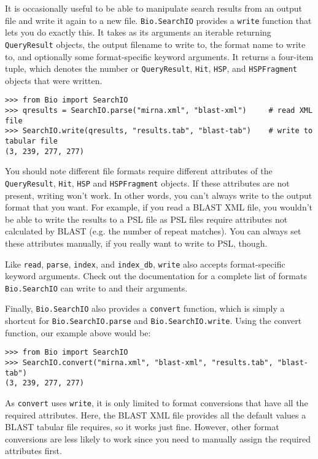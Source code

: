 It is occasionally useful to be able to manipulate search results from an output
file and write it again to a new file. \verb|Bio.SearchIO| provides a
\verb|write| function that lets you do exactly this. It takes as its arguments
an iterable returning \verb|QueryResult| objects, the output filename to write
to, the format name to write to, and optionally some format-specific keyword
arguments. It returns a four-item tuple, which denotes the number or
\verb|QueryResult|, \verb|Hit|, \verb|HSP|, and \verb|HSPFragment| objects that
were written.

\begin{verbatim}
>>> from Bio import SearchIO
>>> qresults = SearchIO.parse("mirna.xml", "blast-xml")     # read XML file
>>> SearchIO.write(qresults, "results.tab", "blast-tab")    # write to tabular file
(3, 239, 277, 277)
\end{verbatim}

You should note different file formats require different attributes of the
\verb|QueryResult|, \verb|Hit|, \verb|HSP| and \verb|HSPFragment| objects. If
these attributes are not present, writing won't work. In other words, you can't
always write to the output format that you want. For example, if you read a
BLAST XML file, you wouldn't be able to write the results to a PSL file as PSL
files require attributes not calculated by BLAST (e.g. the number of repeat
matches). You can always set these attributes manually, if you really want to
write to PSL, though.

Like \verb|read|, \verb|parse|, \verb|index|, and \verb|index_db|, \verb|write|
also accepts format-specific keyword arguments. Check out the documentation for
a complete list of formats \verb|Bio.SearchIO| can write to and their arguments.

Finally, \verb|Bio.SearchIO| also provides a \verb|convert| function, which is
simply a shortcut for \verb|Bio.SearchIO.parse| and \verb|Bio.SearchIO.write|.
Using the convert function, our example above would be:

\begin{verbatim}
>>> from Bio import SearchIO
>>> SearchIO.convert("mirna.xml", "blast-xml", "results.tab", "blast-tab")
(3, 239, 277, 277)
\end{verbatim}

As \verb|convert| uses \verb|write|, it is only limited to format conversions
that have all the required attributes. Here, the BLAST XML file provides all the
default values a BLAST tabular file requires, so it works just fine. However,
other format conversions are less likely to work since you need to manually
assign the required attributes first.
